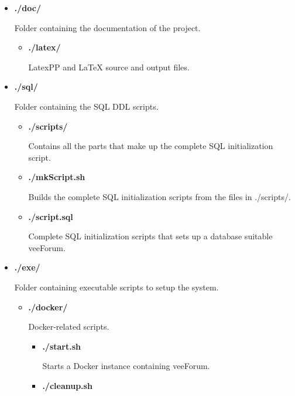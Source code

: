 \documentclass[12pt]{report}
\newcommand{\+}{\discretionary{\mbox{\scriptsize$\hookleftarrow$}}{}{}}
\renewcommand\emph{\textbf}
\begin{document}
            \begin{itemize}
                \item \emph{./doc/}

                    Folder containing the documentation of the project.
                    \begin{itemize}
                        \item \emph{./latex/}

                        LatexPP and \LaTeX{}  source and output files.
                    \end{itemize}

                \item \emph{./sql/}

                    Folder containing the SQL DDL scripts.
                    \begin{itemize}
                        \item \emph{./scripts/}

                        Contains all the parts that make up the complete SQL initialization script.

                        \item \emph{./mkScript.sh}

                        Builds the complete SQL initialization scripts from the files in ./scripts/.

                        \item \emph{./script.sql}

                        Complete SQL initialization scripts that sets up a database suitable veeForum.
                    \end{itemize}

                \item \emph{./exe/}

                    Folder containing executable scripts to setup the system.
                    \begin{itemize}
                        \item \emph{./docker/}

                        Docker-related scripts.
                        \begin{itemize}
                            \item \emph{./start.sh}

                            Starts a Docker instance containing veeForum.

                            \item \emph{./cleanup.sh}


\end{itemize}
\end{itemize}
\end{itemize}
\end{document}

